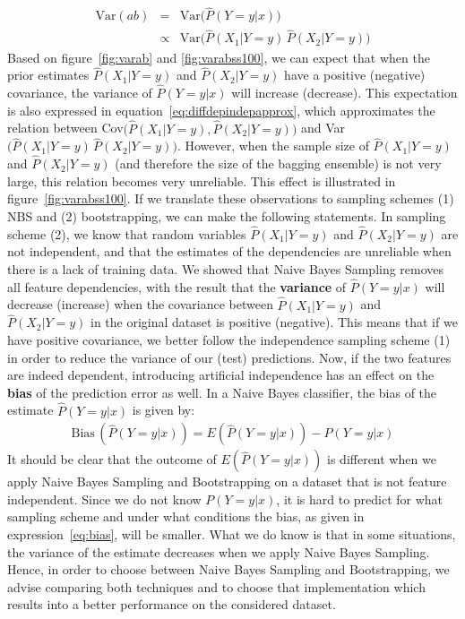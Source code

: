 \begin{eqnarray*}
\mbox{Var}(ab)&=&\mbox{Var}\big(\hat{P}(Y=y|x)\big)\\
&\propto& \mbox{Var}\big( \hat{P}(X_1|Y=y)\,\hat{P}(X_2|Y=y)\big)
\end{eqnarray*}
Based on figure~\ref{fig:varab} and \ref{fig:varabss100}, we can expect that when the prior estimates $\hat{P}(X_1|Y=y)$ and $\hat{P}(X_2|Y=y)$ have a positive (negative) covariance, the variance of $\hat{P}(Y=y|x)$ will increase (decrease). This expectation is also expressed in equation~\ref{eq:diffdepindepapprox}, which approximates the relation between Cov$\big (\hat{P}(X_1|Y=y),\hat{P}(X_2|Y=y)\big)$ and Var$\big (\hat{P}(X_1|Y=y)\,\hat{P}(X_2|Y=y)\big)$. However, when the sample size of $\hat{P}(X_1|Y=y)$ and $\hat{P}(X_2|Y=y)$ (and therefore the size of the bagging ensemble) is not very large, this relation becomes very unreliable. This effect is illustrated in figure~\ref{fig:varabss100}.  If we translate these observations to sampling schemes (1) NBS and (2) bootstrapping, we can make the following statements. In sampling scheme (2), we know that random variables $\hat{P}(X_1|Y=y)$ and $\hat{P}(X_2|Y=y)$ are not independent, and that the estimates of the dependencies are unreliable when there is a lack of training data. We showed that Naive Bayes Sampling removes all feature dependencies, with the result that the \textbf{variance} of $\hat{P}(Y=y|x)$ will decrease (increase) when the covariance between $\hat{P}(X_1|Y=y)$ and $\hat{P}(X_2|Y=y)$  in the original dataset is positive (negative). This means that if we have positive covariance, we better follow the independence sampling scheme (1) in order to reduce the variance of our (test) predictions. Now, if the two features are indeed dependent, introducing artificial independence has an effect on the \textbf{bias} of the prediction error as well. In a Naive Bayes classifier, the bias of the estimate $\hat{P}(Y=y|x)$ is given by:
\begin{eqnarray}
\mbox{Bias}\,(\hat{P}(Y=y|x)) = E(\hat{P}(Y=y|x)) - P(Y=y|x)\label{eq:bias}
\end{eqnarray}
It should be clear that the outcome of $E(\hat{P}(Y=y|x))$ is different when we apply Naive Bayes Sampling and Bootstrapping on a dataset that is not feature independent. Since we do not know $P(Y=y|x)$, it is hard to predict for what sampling scheme and under what conditions the bias, as given in expression~\ref{eq:bias}, will be smaller. 
 What we do know is that in some situations, the variance of the estimate decreases when we apply Naive Bayes Sampling. Hence, in order to choose between Naive Bayes Sampling and Bootstrapping, we advise comparing both techniques and to choose that implementation which results into a better performance on the considered dataset.
 
